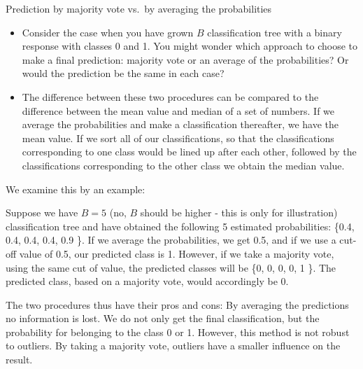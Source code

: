 \documentclass[10pt,ignorenonframetext,]{beamer}
\providecommand{\tightlist}{%
  \setlength{\itemsep}{0pt}\setlength{\parskip}{0pt}}
\begin{document}
\begin{frame}

\begin{block}{Prediction by majority vote vs.~by averaging the
probabilities}

\vspace{1mm}

\begin{itemize}
\tightlist
\item
  Consider the case when you have grown \(B\) classification tree with a
  binary response with classes 0 and 1. You might wonder which approach
  to choose to make a final prediction: majority vote or an average of
  the probabilities? Or would the prediction be the same in each case?
\end{itemize}

\vspace{1mm}

\begin{itemize}
\tightlist
\item
  The difference between these two procedures can be compared to the
  difference between the mean value and median of a set of numbers. If
  we average the probabilities and make a classification thereafter, we
  have the mean value. If we sort all of our classifications, so that
  the classifications corresponding to one class would be lined up after
  each other, followed by the classifications corresponding to the other
  class we obtain the median value.
\end{itemize}

\end{block}

\end{frame}

\begin{frame}

We examine this by an example:

Suppose we have \(B=5\) (no, \(B\) should be higher - this is only for
illustration) classification tree and have obtained the following 5
estimated probabilities: \{0.4, 0.4, 0.4, 0.4, 0.9 \}. If we average the
probabilities, we get 0.5, and if we use a cut-off value of 0.5, our
predicted class is 1. However, if we take a majority vote, using the
same cut of value, the predicted classes will be \{0, 0, 0, 0, 1 \}. The
predicted class, based on a majority vote, would accordingly be 0.

The two procedures thus have their pros and cons: By averaging the
predictions no information is lost. We do not only get the final
classification, but the probability for belonging to the class 0 or 1.
However, this method is not robust to outliers. By taking a majority
vote, outliers have a smaller influence on the result.

\end{frame}
\end{document}
